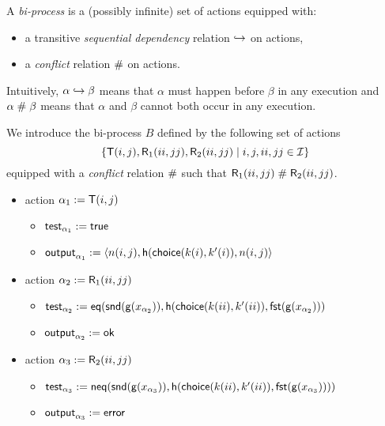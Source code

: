 \begin{definition}
  A \emph{bi-process} is a (possibly infinite) set of actions equipped with:
  \begin{itemize}
    \item a transitive \emph{sequential dependency} relation $\hookrightarrow$ on actions,
    \item a \emph{conflict} relation $\mathrel{\#}$ on actions.
  \end{itemize}
  Intuitively, $\alpha\hookrightarrow\beta$ means that $\alpha$ must happen before $\beta$ in any execution and $\alpha\mathrel{\#}\beta$ means that $\alpha$ and $\beta$ cannot both occur in any execution.
\end{definition}

\begin{example}
  \label{ex:basic-hash-bi-process}
  We introduce the bi-process $B$ defined by the following set of actions $$\{\textsf{T}(i,j),\textsf{R}_1(ii,jj),\textsf{R}_2(ii,jj) \mid i,j,ii,jj \in \mathcal{I}\}$$
  equipped with a \emph{conflict} relation $\mathrel{\#}$ such that $\textsf{R}_1(ii,jj)\mathrel{\#}\textsf{R}_2(ii,jj)$.
  \begin{itemize}
    \item action $\alpha_1 := \textsf{T}(i,j)$
      \begin{itemize}
        \item $\textsf{test}_{\alpha_1} := \textsf{true}$
        \item $\textsf{output}_{\alpha_1} := \langle n(i,j), \mathsf{h}(\mathsf{choice}(k(i),k'(i)),n(i,j) \rangle$
      \end{itemize}
    \item action $\alpha_2 := \textsf{R}_1(ii,jj)$
      \begin{itemize}
        \item $\textsf{test}_{\alpha_2} := \mathsf{eq}(\mathsf{snd}(\mathsf{g}(x_{\alpha_2})),  \mathsf{h}(\mathsf{choice}(k(ii),k'(ii)),\mathsf{fst}(\mathsf{g}(x_{\alpha_2})))$
        \item $\textsf{output}_{\alpha_2} := \mathsf{ok}$
      \end{itemize}
    \item action $\alpha_3 := \textsf{R}_2(ii,jj)$
      \begin{itemize}
        \item $\textsf{test}_{\alpha_3} := \mathsf{neq} (\mathsf{snd}(\mathsf{g}(x_{\alpha_3})),  \mathsf{h}(\mathsf{choice}(k(ii),k'(ii)),\mathsf{fst}(\mathsf{g}(x_{\alpha_3}))))$
        \item $\textsf{output}_{\alpha_3} := \mathsf{error}$
      \end{itemize}
  \end{itemize}
\end{example}

